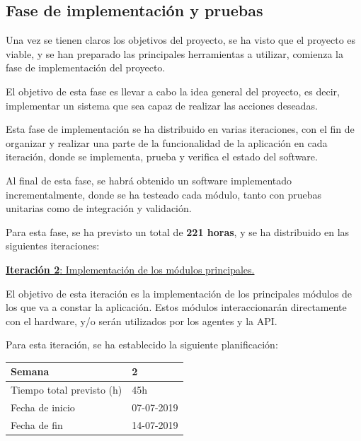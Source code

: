 \subsection{Fase de implementación y pruebas}

Una vez se tienen claros los objetivos del proyecto, se ha visto que el proyecto es viable, y se han preparado las principales herramientas a utilizar, comienza la fase de implementación del proyecto.

El objetivo de esta fase es llevar a cabo la idea general del proyecto, es decir, implementar un sistema que sea capaz de realizar las acciones deseadas.

Esta fase de implementación se ha distribuido en varias iteraciones, con el fin de organizar y realizar una parte de la funcionalidad de la aplicación en cada iteración, donde se implementa, prueba y verifica el estado del software.

Al final de esta fase, se habrá obtenido un software implementado incrementalmente, donde se ha testeado cada módulo, tanto con pruebas unitarias como de integración y validación.

Para esta fase, se ha previsto un total de \textbf{221 horas}, y se ha distribuido en las siguientes iteraciones:

\newpage


\large{\underline{\textbf{Iteración 2}: Implementación de los módulos principales.}}
\vspace{0.3cm}

\normalsize

El objetivo de esta iteración es la implementación de los principales módulos de los que va a constar la aplicación. Estos módulos interaccionarán directamente con el hardware, y/o serán utilizados por los agentes y la API.

Para esta iteración, se ha establecido la siguiente planificación:

\begin{table}[h!]
\centering
\begin{tabular}{|p{5cm}|p{4cm}|}
 \hline
	\cellcolor[gray]{0.9} Semana  & 2\\ \hline
	\cellcolor[gray]{0.9} Tiempo total previsto (h)  & 45h \\ \hline
	\cellcolor[gray]{0.9} Fecha de inicio  & 07-07-2019 \\ \hline
	\cellcolor[gray]{0.9} Fecha de fin  & 14-07-2019 \\ \hline
		
\end{tabular}
\end{table}

